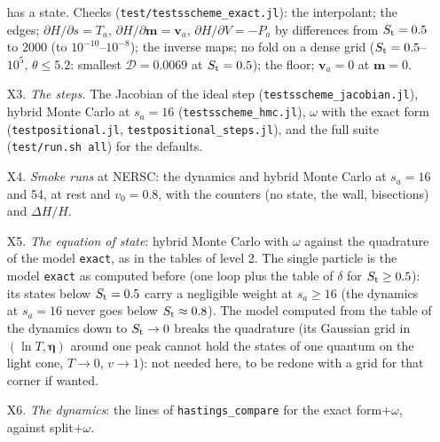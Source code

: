 \documentclass[11pt,aps,preprint,nofootinbib,superscriptaddress,tightenlines]{revtex4-2}
\begin{document}
\begin{enumerate}
  has a state.  Checks (\texttt{test/testsscheme\_exact.jl}): the interpolant; the edges; $\partial H/\partial s=T_a$, $\partial H/\partial\bm m=\bm v_a$,
  $\partial H/\partial V=-P_a$ by differences from $S_{\rm t}=0.5$ to 2000 (to $10^{-10}$--$10^{-8}$); the inverse maps; no fold on a dense grid
  ($S_{\rm t}=0.5$--$10^5$, $\theta\le5.2$: smallest $\mathcal D=0.0069$ at $S_{\rm t}=0.5$); the floor; $\bm v_a=0$ at $\bm m=0$.
\item[X3.] \emph{The steps.}  The Jacobian of the ideal step (\texttt{testsscheme\_jacobian.jl}), hybrid Monte Carlo at $s_a=16$
  (\texttt{testsscheme\_hmc.jl}), $\omega$ with the exact form (\texttt{testpositional.jl}, \texttt{testpositional\_steps.jl}), and the full suite
  (\texttt{test/run.sh all}) for the defaults.
\item[X4.] \emph{Smoke runs} at NERSC: the dynamics and hybrid Monte Carlo at $s_a=16$ and 54, at rest and $v_0=0.8$, with the counters (no state,
  the wall, bisections) and $\Delta H/H$.
\item[X5.] \emph{The equation of state}: hybrid Monte Carlo with $\omega$ against the quadrature of the model \texttt{exact}, as in the tables of level 2.
  The single particle is the model \texttt{exact} as computed before (one loop plus the table of $\delta$ for $S_{\rm t}\ge0.5$): its states below
  $S_{\rm t}=0.5$ carry a negligible weight at $s_a\ge16$ (the dynamics at $s_a=16$ never goes below $S_{\rm t}\approx0.8$).  The model computed from the
  table of the dynamics down to $S_{\rm t}\to0$ breaks the quadrature (its Gaussian grid in $(\ln T,\bm\eta)$ around one peak cannot hold the states of
  one quantum on the light cone, $T\to0$, $v\to1$): not needed here, to be redone with a grid for that corner if wanted.
\item[X6.] \emph{The dynamics}: the lines of \texttt{hastings\_compare} for the exact form$+\omega$, against split$+\omega$.
\end{enumerate}
\end{document}
